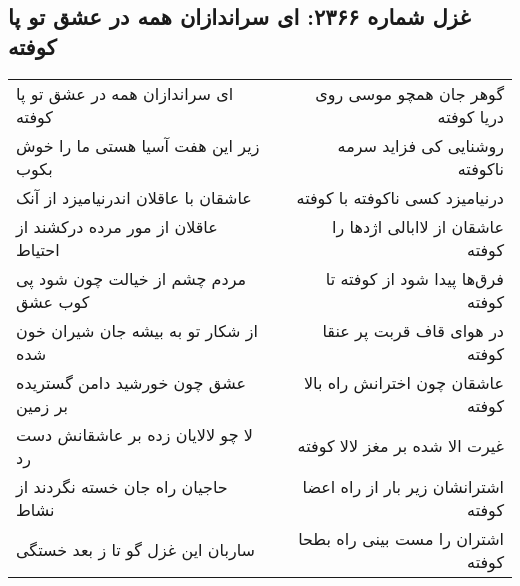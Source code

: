 \begin{center}
\section*{غزل شماره ۲۳۶۶: ای سراندازان همه در عشق تو پا کوفته}
\label{sec:2366}
\begin{longtable}{l p{0.5cm} r}
ای سراندازان همه در عشق تو پا کوفته
&&
گوهر جان همچو موسی روی دریا کوفته
\\
زیر این هفت آسیا هستی ما را خوش بکوب
&&
روشنایی کی فزاید سرمه ناکوفته
\\
عاشقان با عاقلان اندرنیامیزد از آنک
&&
درنیامیزد کسی ناکوفته با کوفته
\\
عاقلان از مور مرده درکشند از احتیاط
&&
عاشقان از لاابالی اژدها را کوفته
\\
مردم چشم از خیالت چون شود پی کوب عشق
&&
فرق‌ها پیدا شود از کوفته تا کوفته
\\
از شکار تو به بیشه جان شیران خون شده
&&
در هوای قاف قربت پر عنقا کوفته
\\
عشق چون خورشید دامن گستریده بر زمین
&&
عاشقان چون اخترانش راه بالا کوفته
\\
لا چو لالایان زده بر عاشقانش دست رد
&&
غیرت الا شده بر مغز لالا کوفته
\\
حاجیان راه جان خسته نگردند از نشاط
&&
اشترانشان زیر بار از راه اعضا کوفته
\\
ساربان این غزل گو تا ز بعد خستگی
&&
اشتران را مست بینی راه بطحا کوفته
\\
\end{longtable}
\end{center}
